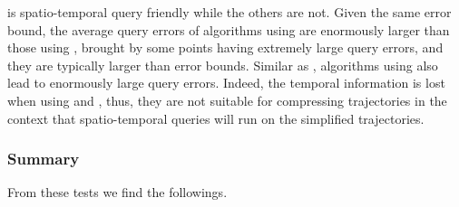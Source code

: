 \sed is spatio-temporal query friendly while the others are not.
Given the same error bound, the average query errors of algorithms using \ped are enormously larger than those using \sed, brought by some points having extremely large query errors, and they are typically larger than error bounds. 
Similar as \ped, algorithms using \dad also lead to enormously large query errors. 
Indeed, the temporal information is lost when using \ped and \dad, thus, they are not suitable for compressing trajectories in the context that spatio-temporal queries will run on the simplified trajectories.




\subsubsection{Summary}
From these tests we find the followings.

